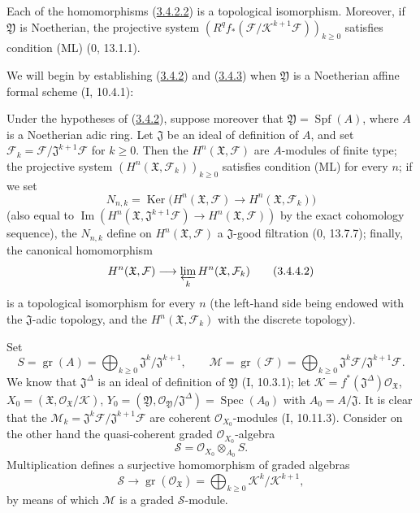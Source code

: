 \begin{corollary}[3.4.3]
\label{III.3.4.3}
Each of the homomorphisms (\hyperref[III.3.4.2.2]{3.4.2.2}) is a
topological isomorphism. Moreover, if $\mathfrak Y$ is Noetherian, the
projective system
$(R^qf_*(\mathcal F/\mathcal K^{k+1}\mathcal F))_{k\geq0}$ satisfies
condition (ML) (0, 13.1.1).
\end{corollary}

We will begin by establishing (\hyperref[III.3.4.2]{3.4.2}) and
(\hyperref[III.3.4.3]{3.4.3}) when $\mathfrak Y$ is a Noetherian affine
formal scheme (I, 10.4.1):

\begin{corollary}[3.4.4]
\label{III.3.4.4}
Under the hypotheses of (\hyperref[III.3.4.2]{3.4.2}), suppose moreover
that $\mathfrak Y=\operatorname{Spf}(A)$, where $A$ is a Noetherian adic
ring. Let $\mathfrak J$ be an ideal of definition of $A$, and set
$\mathcal F_k=\mathcal F/\mathfrak J^{k+1}\mathcal F$ for $k\geq0$. Then
the $H^n(\mathfrak X,\mathcal F)$ are $A$-modules of finite type; the
projective system $(H^n(\mathfrak X,\mathcal F_k))_{k\geq0}$ satisfies
condition (ML) for every $n$; if we set
\[
N_{n,k}=\operatorname{Ker}\bigl(H^n(\mathfrak X,\mathcal F)
\longrightarrow H^n(\mathfrak X,\mathcal F_k)\bigr)
\tag{3.4.4.1}\label{III.3.4.4.1}
\]
(also equal to
$\operatorname{Im}(H^n(\mathfrak X,\mathfrak J^{k+1}\mathcal F)
\to H^n(\mathfrak X,\mathcal F))$ by the exact cohomology sequence), the
$N_{n,k}$ define on $H^n(\mathfrak X,\mathcal F)$ a
$\mathfrak J$-good filtration (0, 13.7.7); finally, the canonical homomorphism
\[
H^n(\mathfrak X,\mathcal F)
\longrightarrow\varprojlim_kH^n(\mathfrak X,\mathcal F_k)
\tag{3.4.4.2}\label{III.3.4.4.2}
\]
is a topological isomorphism for every $n$ (the left-hand side being endowed
with the $\mathfrak J$-adic topology, and the $H^n(\mathfrak X,\mathcal F_k)$ with
the discrete topology).
\end{corollary}

Set
\[
S=\operatorname{gr}(A)=\bigoplus_{k\geq0}
\mathfrak J^k/\mathfrak J^{k+1},\qquad
\mathcal M=\operatorname{gr}(\mathcal F)=\bigoplus_{k\geq0}
\mathfrak J^k\mathcal F/\mathfrak J^{k+1}\mathcal F.
\tag{3.4.4.3}\label{III.3.4.4.3}
\]
We know that $\mathfrak J^\Delta$ is an ideal of definition of $\mathfrak Y$
(I, 10.3.1); let
$\mathcal K=f^*(\mathfrak J^\Delta)\mathcal O_{\mathfrak X}$,
$X_0=(\mathfrak X,\mathcal O_{\mathfrak X}/\mathcal K)$,
$Y_0=(\mathfrak Y,\mathcal O_{\mathfrak Y}/\mathfrak J^\Delta)
=\operatorname{Spec}(A_0)$ with $A_0=A/\mathfrak J$. It is clear that the
$\mathcal M_k=\mathfrak J^k\mathcal F/\mathfrak J^{k+1}\mathcal F$ are
coherent $\mathcal O_{X_0}$-modules (I, 10.11.3). Consider on the other hand the
quasi-coherent graded $\mathcal O_{X_0}$-algebra
\[
\mathcal S=\mathcal O_{X_0}\otimes_{A_0}S.
\tag{3.4.4.4}\label{III.3.4.4.4}
\]
Multiplication defines a surjective homomorphism of graded algebras
\[
\mathcal S\longrightarrow
\operatorname{gr}(\mathcal O_{\mathfrak X})
=\bigoplus_{k\geq0}\mathcal K^k/\mathcal K^{k+1},
\]
by means of which $\mathcal M$ is a graded $\mathcal S$-module.

